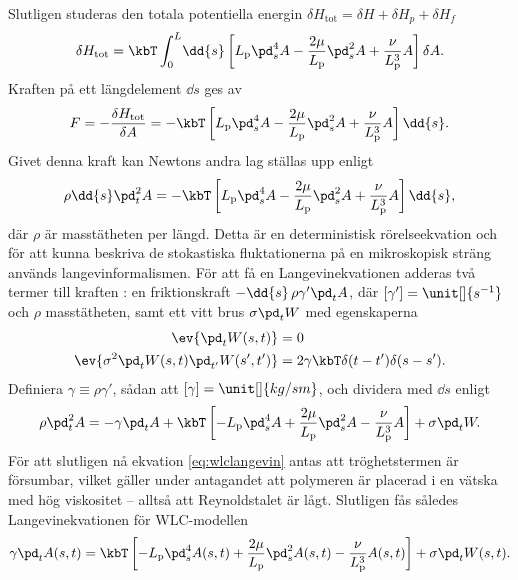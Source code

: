Slutligen studeras den totala potentiella energin $\delta H_\text{tot} = \delta H + \delta H_p + \delta H_f$ 
\begin{equation}
     \delta H_\text{tot} = \kbT\int_0^L\!\dd{s} \left[L_\text{p}\pd_s^4A-\frac{2\mu}{L_\text{p}}\pd_s^2A+\frac{\nu}{L_\text{p}^3}A \right]\delta A. 
\end{equation}
Kraften på ett längdelement $\dd{s}$ ges av 
\begin{equation}\label{eq:F}
      F = -\frac{\delta H_\text{tot}}{\delta A} = -\kbT\left[L_\text{p}\pd_s^4A-\frac{2\mu}{L_\text{p}}\pd_s^2A+\frac{\nu}{L_\text{p}^3}A \right]\dd{s} .
\end{equation}
Givet denna kraft kan Newtons andra lag ställas upp enligt 
\begin{equation}
      \rho\dd{s}\pd_t^2A = -\kbT\left[L_\text{p}\pd_s^4A-\frac{2\mu}{L_\text{p}}\pd_s^2A+\frac{\nu}{L_\text{p}^3}A \right]\dd{s},
\end{equation}
där $\rho$ är masstätheten per längd. Detta är en deterministisk rörelseekvation och för att kunna beskriva de stokastiska fluktationerna på en mikroskopisk sträng används langevinformalismen. För att få en Langevinekvationen adderas två termer till kraften \cite{Bullerjahn2011,Dhar,VanKampen2007}: en friktionskraft $-\dd{s}\,\rho\gamma'\pd_tA$, där $[\gamma'] = \unit[]{s^{-1}}$ och $\rho$ masstätheten, samt ett vitt brus $\sigma\pd_t W$ med egenskaperna 
\begin{equation}
\begin{aligned}
    \ev{\pd_t W(s,t)} &= 0\\
    \ev{\sigma^2\pd_t W(s,t)\pd_{t'} W(s',t')} &= 2\gamma \kbT\delta(t-t')\delta(s-s').
    \end{aligned}
\end{equation}
Definiera $\gamma \equiv \rho\gamma'$, sådan att $[\gamma]=\unit[]{kg/sm}$, och dividera med $\dd{s}$ enligt 
\begin{equation}
      \rho\pd_t^2A = -\gamma\pd_tA+ \kbT\left[-L_\text{p}\pd_s^4A+\frac{2\mu}{L_\text{p}}\pd_s^2A-\frac{\nu}{L_\text{p}^3}A \right]+\sigma\pd_tW.
\end{equation}
För att slutligen nå ekvation \eqref{eq:wlclangevin} antas att tröghetstermen är försumbar, vilket gäller under antagandet att polymeren är placerad i en vätska med hög viskositet \cite{Dhar} -- alltså att Reynoldstalet är lågt. Slutligen fås således Langevinekvationen för WLC-modellen
\begin{equation}
    \gamma\pd_tA(s,t) = \kbT\left[-L_\text{p}\pd_s^4A(s,t)+\frac{2\mu}{L_\text{p}}\pd_s^2A(s,t)-\frac{\nu}{L_\text{p}^3}A(s,t) \right]+\sigma\pd_tW(s,t).
\end{equation}

